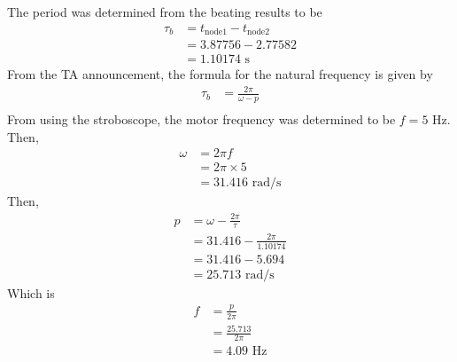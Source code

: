 
The period was determined from the beating results to be 
\begin{align*}
    \tau_b &= t_{\text{node1}} - t_{\text{node2}} \\
    &= 3.87756 - 2.77582 \\
    &= 1.10174 \text{ s}
\end{align*}
From the TA announcement, the formula for the natural frequency is given by
\begin{align*}
    \tau_b &= \frac{2\pi}{\omega - p} \\
\end{align*}
From using the stroboscope, the motor frequency was determined to be $f = 5 \text{ Hz}$. Then,
\begin{align*}
    \omega &= 2\pi f \\
    &= 2\pi \times 5 \\
    &= 31.416 \text{ rad/s}
\end{align*}
Then,
\begin{align*}
    p &= \omega - \frac{2\pi}{\tau} \\
    &= 31.416 - \frac{2\pi}{1.10174} \\
    &= 31.416 - 5.694 \\
    &= 25.713 \text{ rad/s}
\end{align*}
Which is 
\begin{align*}
    f &= \frac{p}{2\pi} \\
    &= \frac{25.713}{2\pi} \\
    &= \boxed{4.09 \text{ Hz}}
\end{align*}